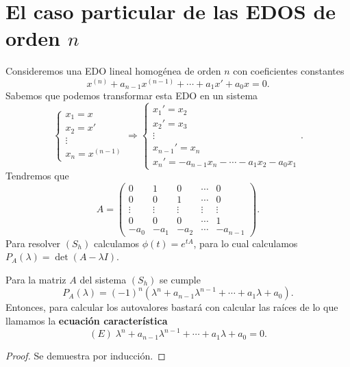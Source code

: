 \section{El caso particular de las EDOS de orden $\displaystyle n $}
Consideremos una EDO lineal homogénea de orden $\displaystyle n $ con coeficientes constantes
\[x^{\left(n\right)} + a_{n-1}x^{\left(n-1\right)} + \cdots + a_{1}x' + a_{0}x = 0 .\]
Sabemos que podemos transformar esta EDO en un sistema 
\[
\begin{cases}
x_{1}=x \\
x_{2}=x' \\
\vdots \\
x_{n}=x^{\left(n-1\right)}
\end{cases}
\Rightarrow 
\begin{cases}
x_{1}' = x_{2} \\
x_{2}' = x_{3} \\
\vdots \\
x_{n-1}' = x_{n} \\
x_{n}' = -a_{n-1}x_{n} - \cdots - a_{1}x_{2}-a_{0}x_{1}
\end{cases}
.\]
Tendremos que 
\[A = \begin{pmatrix} 0 & 1 & 0 & \cdots & 0 \\
0 & 0 & 1 & \cdots & 0 \\
 \vdots & \vdots & \vdots & \vdots & \vdots  \\
0 & 0 & 0 & \cdots & 1 \\
-a_{0} & -a_{1} & - a_{2} & \cdots & - a_{n-1}\end{pmatrix} .\]
Para resolver $\displaystyle \left(S_{h}\right) $ calculamos $\displaystyle \phi\left(t\right)=e^{tA} $, para lo cual calculamos $\displaystyle P_{A}\left(\lambda \right)=\det\left(A-\lambda I\right) $. 
\begin{prop}
Para la matriz $\displaystyle A $ del sistema $\displaystyle \left(S_{h}\right) $ se cumple 
\[P_{A}\left(\lambda \right)=\left(-1\right)^{n}\left(\lambda^{n} + a_{n-1}\lambda^{n-1} + \cdots + a_{1}\lambda + a_{0}\right) .\]
Entonces, para calcular los autovalores bastará con calcular las raíces de lo que llamamos la \textbf{ecuación característica} 
\[ \left(E\right) \; \lambda^{n} + a_{n-1}\lambda^{n-1} + \cdots + a_{1}\lambda + a_{0}=0 .\]
\end{prop}
\begin{proof}
Se demuestra por inducción.
\end{proof}

